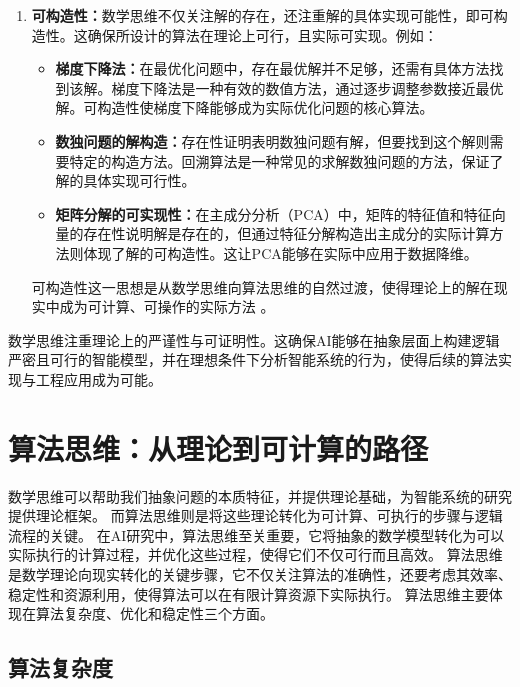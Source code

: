 \begin{enumerate}
\begin{itemize}
\item {\bf 神经网络中的逼近定理：}神经网络的万能逼近定理表明，只要层数和神经元数量足够多，前馈神经网络就能够逼近任意连续函数。这一存在性定理确保了神经网络在理论上具备学习复杂映射关系的能力，为构建强大的模型提供了可能性。
\end{itemize}
\item {\bf 可构造性：}数学思维不仅关注解的存在，还注重解的具体实现可能性，即可构造性。这确保所设计的算法在理论上可行，且实际可实现。例如：
\begin{itemize}
\item {\bf 梯度下降法：}在最优化问题中，存在最优解并不足够，还需有具体方法找到该解。梯度下降法是一种有效的数值方法，通过逐步调整参数接近最优解。可构造性使梯度下降能够成为实际优化问题的核心算法。
\item {\bf 数独问题的解构造：}存在性证明表明数独问题有解，但要找到这个解则需要特定的构造方法。回溯算法是一种常见的求解数独问题的方法，保证了解的具体实现可行性。
\item {\bf 矩阵分解的可实现性：}在主成分分析（PCA）中，矩阵的特征值和特征向量的存在性说明解是存在的，但通过特征分解构造出主成分的实际计算方法则体现了解的可构造性。这让PCA能够在实际中应用于数据降维。
\end{itemize}
可构造性这一思想是从数学思维向算法思维的自然过渡，使得理论上的解在现实中成为可计算、可操作的实际方法 。
\end{enumerate}
数学思维注重理论上的严谨性与可证明性。这确保AI能够在抽象层面上构建逻辑严密且可行的智能模型，并在理想条件下分析智能系统的行为，使得后续的算法实现与工程应用成为可能。
\section{ 算法思维：从理论到可计算的路径}



数学思维可以帮助我们抽象问题的本质特征，并提供理论基础，为智能系统的研究提供理论框架。
而算法思维则是将这些理论转化为可计算、可执行的步骤与逻辑流程的关键。
在AI研究中，算法思维至关重要，它将抽象的数学模型转化为可以实际执行的计算过程，并优化这些过程，使得它们不仅可行而且高效。
算法思维是数学理论向现实转化的关键步骤，它不仅关注算法的准确性，还要考虑其效率、稳定性和资源利用，使得算法可以在有限计算资源下实际执行。
算法思维主要体现在算法复杂度、优化和稳定性三个方面。
\subsection{算法复杂度}

